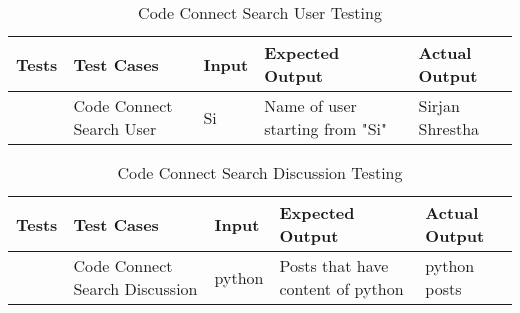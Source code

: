 \begin{table}[H]
    \caption{Code Connect Search User Testing}
        \label{}
        \begin{tabularx}{\textwidth}{|>{\raggedright\arraybackslash}p{0.3in}|Y|Y|Y|Y|}
        \hline
        Tests & Test Cases & Input &Expected Output & Actual Output \\
         & Code Connect Search User& Si& Name of user starting from "Si"& Sirjan Shrestha \\
            \hline
\end{tabularx}
\end{table}
\begin{table}[H]
    \caption{Code Connect Search Discussion Testing}
        \label{}
        \begin{tabularx}{\textwidth}{|>{\raggedright\arraybackslash}p{0.3in}|Y|Y|Y|Y|}
        \hline
        Tests & Test Cases & Input &Expected Output & Actual Output \\
         & Code Connect Search Discussion& python& Posts that have content of python& python posts \\
            \hline
\end{tabularx}
\end{table}



